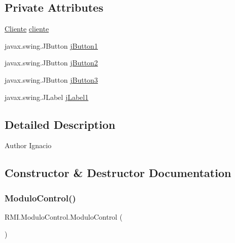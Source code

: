 \subsection*{Private Attributes}
\begin{DoxyCompactItemize}
\item 
\mbox{\hyperlink{class_r_m_i_1_1_cliente}{Cliente}} \mbox{\hyperlink{class_r_m_i_1_1_modulo_control_affa108de8511c1fdd849d2d6a6304d4e}{cliente}}
\item 
javax.\+swing.\+J\+Button \mbox{\hyperlink{class_r_m_i_1_1_modulo_control_a925d9d1d7eff319b2573c334a20e3da1}{j\+Button1}}
\item 
javax.\+swing.\+J\+Button \mbox{\hyperlink{class_r_m_i_1_1_modulo_control_aa5861c17fe034c546e4c455e4c86b1ad}{j\+Button2}}
\item 
javax.\+swing.\+J\+Button \mbox{\hyperlink{class_r_m_i_1_1_modulo_control_af7702c5fb7079fd87c45617ca34997d2}{j\+Button3}}
\item 
javax.\+swing.\+J\+Label \mbox{\hyperlink{class_r_m_i_1_1_modulo_control_a4b11316f909c6d5bda3ccd3d1d41ce92}{j\+Label1}}
\end{DoxyCompactItemize}


\subsection{Detailed Description}
\begin{DoxyAuthor}{Author}
Ignacio 
\end{DoxyAuthor}


\subsection{Constructor \& Destructor Documentation}
\mbox{\label{class_r_m_i_1_1_modulo_control_a59c204b1a6186d387912952c321b34be}} 
\subsubsection{\texorpdfstring{Modulo\+Control()}{ModuloControl()}}
{\footnotesize\ttfamily R\+M\+I.\+Modulo\+Control.\+Modulo\+Control (\begin{DoxyParamCaption}{ }\end{DoxyParamCaption})\hspace{0.3cm}{\ttfamily [inline]}}


